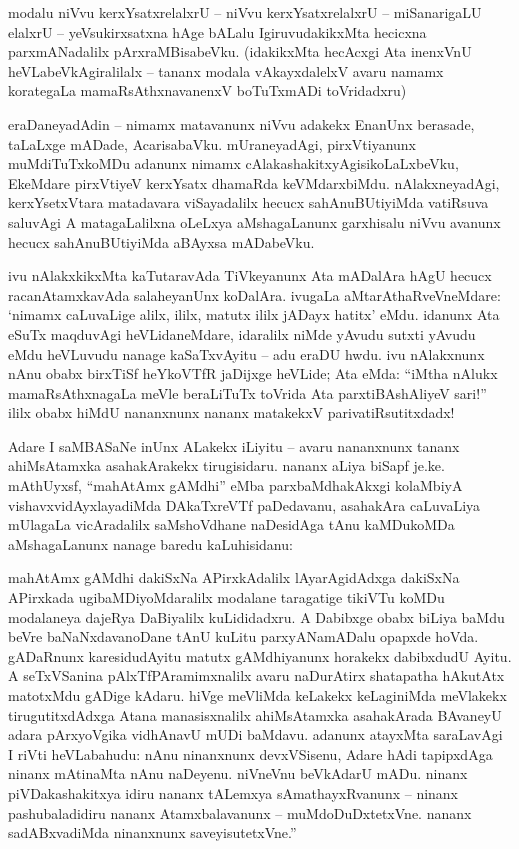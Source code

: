 modalu niVvu kerxYsatxrelalxrU -- niVvu kerxYsatxrelalxrU -- miSanarigaLU elalxrU -- yeVsukirxsatxna hAge bALalu IgiruvudakikxMta hecicxna parxmANadalilx pArxraMBisabeVku. (idakikxMta hecAcxgi Ata inenxVnU heVLabeVkAgiralilalx -- tananx modala vAkayxdalelxV avaru namamx korategaLa mamaRsAthxnavanenxV boTuTxmADi toVridadxru)

eraDaneyadAdin -- nimamx matavanunx niVvu adakekx EnanUnx berasade, taLaLxge mADade, AcarisabaVku. mUraneyadAgi, pirxVtiyanunx muMdiTuTxkoMDu adanunx nimamx cAlakashakitxyAgisikoLaLxbeVku, EkeMdare pirxVtiyeV kerxYsatx dhamaRda keVMdarxbiMdu. nAlakxneyadAgi, kerxYsetxVtara matadavara viSayadalilx hecucx sahAnuBUtiyiMda vatiRsuva saluvAgi A matagaLalilxna oLeLxya aMshagaLanunx garxhisalu niVvu avanunx hecucx sahAnuBUtiyiMda aBAyxsa mADabeVku.

ivu nAlakxkikxMta kaTutaravAda TiVkeyanunx Ata mADalAra hAgU hecucx racanAtamxkavAda salaheyanUnx koDalAra. ivugaLa aMtarAthaRveVneMdare: `nimamx caLuvaLige alilx, ililx, matutx ililx jADayx hatitx' eMdu. idanunx Ata eSuTx maqduvAgi heVLidaneMdare, idaralilx niMde yAvudu sutxti yAvudu eMdu heVLuvudu nanage kaSaTxvAyitu -- adu eraDU hwdu. ivu nAlakxnunx nAnu obabx birxTiSf heYkoVTfR jaDijxge heVLide; Ata eMda: ``iMtha nAlukx mamaRsAthxnagaLa meVle beraLiTuTx toVrida Ata parxtiBAshAliyeV sari!'' ililx obabx hiMdU nananxnunx nananx matakekxV parivatiRsutitxdadx!

Adare I saMBASaNe inUnx ALakekx iLiyitu -- avaru nananxnunx tananx ahiMsAtamxka asahakArakekx tirugisidaru. nananx aLiya biSapf je.ke. mAthUyxsf, ``mahAtAmx gAMdhi'' eMba parxbaMdhakAkxgi kolaMbiyA vishavxvidAyxlayadiMda DAkaTxreVTf paDedavanu, asahakAra caLuvaLiya mUlagaLa vicAradalilx saMshoVdhane naDesidAga tAnu kaMDukoMDa aMshagaLanunx nanage baredu kaLuhisidanu: 

\begin{minipage}[c]{1cm}
\quad
\end{minipage}
\begin{minipage}[c]{8.5cm}
mahAtAmx gAMdhi dakiSxNa APirxkAdalilx lAyarAgidAdxga dakiSxNa APirxkada ugibaMDiyoMdaralilx modalane taragatige tikiVTu koMDu modalaneya dajeRya DaBiyalilx kuLididadxru. A Dabibxge obabx biLiya baMdu beVre baNaNxdavanoDane tAnU kuLitu parxyANamADalu opapxde hoVda. gADaRnunx karesidudAyitu matutx gAMdhiyanunx horakekx dabibxdudU Ayitu. A seTxVSanina pAlxTfPAramimxnalilx avaru naDurAtirx shatapatha hAkutAtx matotxMdu gADige kAdaru. hiVge meVliMda keLakekx keLaginiMda meVlakekx tirugutitxdAdxga Atana manasisxnalilx ahiMsAtamxka asahakArada BAvaneyU adara pArxyoVgika vidhAnavU mUDi baMdavu. adanunx atayxMta saraLavAgi I riVti heVLabahudu: nAnu ninanxnunx devxVSisenu, Adare hAdi tapipxdAga ninanx mAtinaMta nAnu naDeyenu. niVneVnu beVkAdarU mADu. ninanx piVDakashakitxya idiru nananx tALemxya sAmathayxRvanunx -- ninanx pashubaladidiru nananx Atamxbalavanunx -- muMdoDuDxtetxVne. nananx sadABxvadiMda ninanxnunx saveyisutetxVne.''
\end{minipage}

